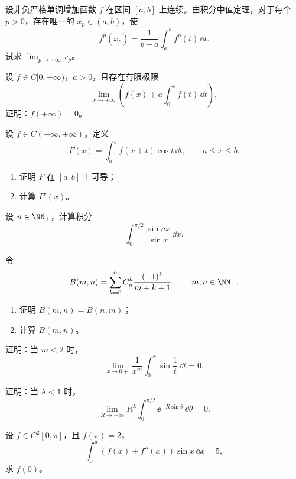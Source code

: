 \begin{xreferenceproblem}[13]
设非负严格单调增加函数 $f$ 在区间 $[a,b]$ 上连续。由积分中值定理，对于每个 $p>0$，存在唯一的 $x_p\in(a,b)$，使
\[
  f^p(x_p)=\frac1{b-a}\int_a^b f^p(t)\,\dd t.
\]
试求 $\lim_{p\to+\infty}x_p$。
\end{xreferenceproblem}

\begin{xreferenceproblem}[14]
设 $f\in C[0,+\infty)$，$a>0$，且存在有限极限
\[
  \lim_{x\to+\infty}\left(f(x)+a\int_0^x f(t)\,\dd t\right),
\]
证明：$f(+\infty)=0$。
\end{xreferenceproblem}

\begin{xreferenceproblem}[15]
设 $f\in C(-\infty,+\infty)$，定义
\[
  F(x)=\int_a^b f(x+t)\cos t\,\dd t,\qquad a\leqslant x\leqslant b.
\]
\begin{enumerate}[label=(\arabic*)]
  \item 证明 $F$ 在 $[a,b]$ 上可导；
  \item 计算 $F'(x)$。
\end{enumerate}
\end{xreferenceproblem}

\begin{xreferenceproblem}[16]
设 $n\in\NN_+$，计算积分
\[
  \int_0^{\pi/2}\frac{\sin nx}{\sin x}\,\dd x.
\]
\end{xreferenceproblem}

\begin{xreferenceproblem}[17]
令
\[
  B(m,n)=\sum_{k=0}^n C_n^k\frac{(-1)^k}{m+k+1},\qquad m,n\in\NN_+.
\]
\begin{enumerate}[label=(\arabic*)]
  \item 证明 $B(m,n)=B(n,m)$；
  \item 计算 $B(m,n)$。
\end{enumerate}
\end{xreferenceproblem}

\begin{xreferenceproblem}[18]
证明：当 $m<2$ 时，
\[
  \lim_{x\to0+}\frac1{x^m}\int_0^x\sin\frac1t\,\dd t=0.
\]
\end{xreferenceproblem}

\begin{xreferenceproblem}[19]
证明：当 $\lambda<1$ 时，
\[
  \lim_{R\to+\infty}R^\lambda\int_0^{\pi/2}\ee^{-R\sin\theta}\,\dd\theta=0.
\]
\end{xreferenceproblem}

\begin{xreferenceproblem}[20]
设 $f\in C^2[0,\pi]$，且 $f(\pi)=2$，
\[
  \int_0^\pi(f(x)+f''(x))\sin x\,\dd x=5,
\]
求 $f(0)$。
\end{xreferenceproblem}

